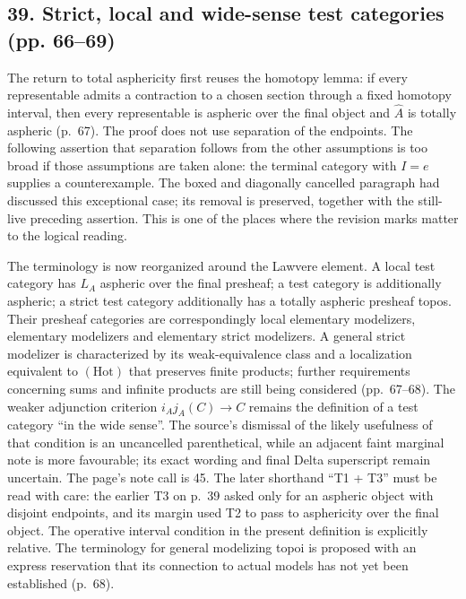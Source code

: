 \subsection*{39. Strict, local and wide-sense test categories (pp. 66--69)}
The return to total asphericity first reuses the homotopy lemma: if every representable admits a contraction to a chosen section through a fixed homotopy interval, then every representable is aspheric over the final object and $\widehat A$ is totally aspheric (p.~67). The proof does not use separation of the endpoints. The following assertion that separation follows from the other assumptions is too broad if those assumptions are taken alone: the terminal category with $I=e$ supplies a counterexample. The boxed and diagonally cancelled paragraph had discussed this exceptional case; its removal is preserved, together with the still-live preceding assertion. This is one of the places where the revision marks matter to the logical reading.

The terminology is now reorganized around the Lawvere element. A local test category has $L_A$ aspheric over the final presheaf; a test category is additionally aspheric; a strict test category additionally has a totally aspheric presheaf topos. Their presheaf categories are correspondingly local elementary modelizers, elementary modelizers and elementary strict modelizers. A general strict modelizer is characterized by its weak-equivalence class and a localization equivalent to $(\mathrm{Hot})$ that preserves finite products; further requirements concerning sums and infinite products are still being considered (pp.~67--68). The weaker adjunction criterion $i_Aj_A(C)\to C$ remains the definition of a test category ``in the wide sense''. The source's dismissal of the likely usefulness of that condition is an uncancelled parenthetical, while an adjacent faint marginal note is more favourable; its exact wording and final Delta superscript remain uncertain. The page's note call is 45. The later shorthand ``T1 + T3'' must be read with care: the earlier T3 on p.~39 asked only for an aspheric object with disjoint endpoints, and its margin used T2 to pass to asphericity over the final object. The operative interval condition in the present definition is explicitly relative. The terminology for general modelizing topoi is proposed with an express reservation that its connection to actual models has not yet been established (p.~68).

